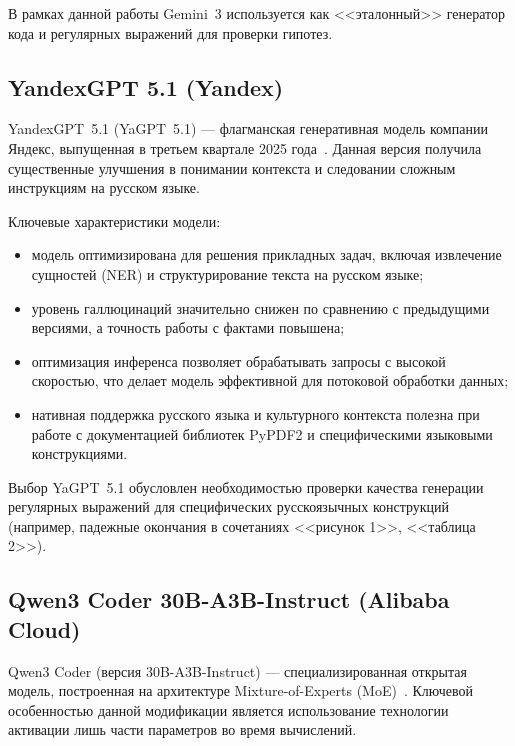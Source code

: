 В рамках данной работы Gemini~3 используется как <<эталонный>> генератор кода и регулярных выражений для проверки гипотез.

\subsection{YandexGPT 5.1 (Yandex)}
YandexGPT~5.1 (YaGPT~5.1) --- флагманская генеративная модель компании Яндекс, выпущенная в третьем квартале 2025 года~\cite{yagpt5_release}. Данная версия получила существенные улучшения в понимании контекста и следовании сложным инструкциям на русском языке.

Ключевые характеристики модели:
\begin{itemize}
    \item модель оптимизирована для решения прикладных задач, включая извлечение сущностей (NER) и структурирование текста на русском языке;
    \item уровень галлюцинаций значительно снижен по сравнению с предыдущими версиями, а точность работы с фактами повышена;
    \item оптимизация инференса позволяет обрабатывать запросы с высокой скоростью, что делает модель эффективной для потоковой обработки данных;
    \item нативная поддержка русского языка и культурного контекста полезна при работе с документацией библиотек PyPDF2 и специфическими языковыми конструкциями.
\end{itemize}

Выбор YaGPT~5.1 обусловлен необходимостью проверки качества генерации регулярных выражений для специфических русскоязычных конструкций (например, падежные окончания в сочетаниях <<рисунок 1>>, <<таблица 2>>).

\subsection{Qwen3 Coder 30B-A3B-Instruct (Alibaba Cloud)}
Qwen3 Coder (версия 30B-A3B-Instruct) --- специализированная открытая модель, построенная на архитектуре Mixture-of-Experts (MoE)~\cite{qwen3_coder}. Ключевой особенностью данной модификации является использование технологии активации лишь части параметров во время вычислений.

